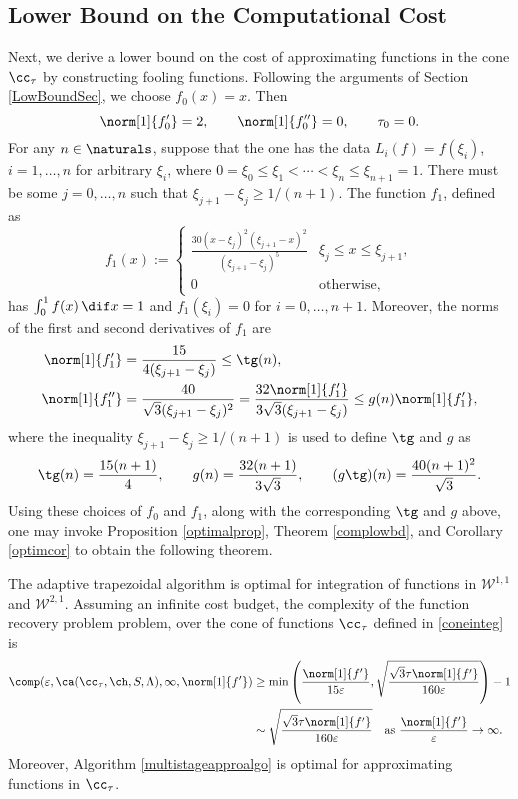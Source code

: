 \subsection{Lower Bound on the Computational Cost}
Next, we derive a lower bound on the cost of approximating functions in the cone $\cc_{\tau}$ by constructing fooling functions. Following the arguments of Section \ref{LowBoundSec}, we choose  $f_0(x)=x.$ Then
\[
\norm[1]{f'_0}=2, \qquad \norm[1]{f''_0}=0, \qquad \tau_0=0.
\]
For any $n \in \naturals$, suppose that the one has the data $L_i(f)=f(\xi_i)$, $i=1, \ldots, n$ for arbitrary $\xi_i$, where $0=\xi_0 \le \xi_1 < \cdots < \xi_n \le \xi_{n+1} = 1$.  There must be some $j=0, \ldots, n$ such that $\xi_{j+1} - \xi_j \ge 1/(n+1)$.  The function $f_{1}$, defined as
$$
f_{1}(x):=\begin{cases} \displaystyle
\frac{30(x-\xi_{j})^{2}(\xi_{j+1}-x)^{2}}{(\xi_{j+1}-\xi_{j})^5} & \xi_{j} \le x \leq \xi_{j+1},\\
0 & \text{otherwise},
\end{cases}
$$
has $\int_0^1 f(x) \, \dif x=1$ and $f_1(\xi_i)=0$ for $i=0, \ldots, n+1$.  Moreover, the norms of the first and second derivatives of $f_1$ are
\begin{align*}
\norm[1]{f'_1}&=\frac{15}{4(\xi_{j+1}-\xi_{j})}\leq \tg(n),\\
\norm[1]{f''_1}&=\frac{40}{\sqrt{3}(\xi_{j+1}-\xi_{j})^2}
=\frac{32\norm[1]{f'_1}}{3\sqrt{3}(\xi_{j+1}-\xi_{j})}
 \leq g(n) \norm[1]{f'_1},
\end{align*}
where the inequality $\xi_{j+1} - \xi_j \ge 1/(n+1)$ is used to define $\tg$ and $g$ as
\[
\tg(n) = \frac{15(n+1)}{4}, \qquad g(n) = \frac{32(n+1)}{3\sqrt{3}}, \qquad (g\tg)(n) = \frac{40(n+1)^2}{\sqrt{3}}.
\]
Using these choices of $f_0$ and $f_1$, along with the corresponding $\tg$ and $g$ above, one may invoke Proposition \ref{optimalprop}, Theorem \ref{complowbd}, and Corollary \ref{optimcor} to obtain the following theorem.

\begin{theorem} \label{complowbdinteg} The adaptive trapezoidal algorithm is optimal for integration of functions in $\mathcal{W}^{1,1}$ and $\mathcal{W}^{2,1}$. Assuming an infinite cost budget, the complexity of the function recovery problem problem, over the cone of functions $\cc_{\tau}$ defined in \eqref{coneinteg} is
\begin{align*}
\comp(\varepsilon,\ca(\cc_{\tau},\ch,S,\Lambda),\infty,\norm[1]{f'})
&\ge \min\left(\frac{\norm[1]{f'}}{15 \varepsilon}, \sqrt{\frac{\sqrt{3}\tau\norm[1]{f'}}{160\varepsilon}} \right)-1\\
& \sim \sqrt{\frac{\sqrt{3}\tau\norm[1]{f'}}{160\varepsilon}}  \quad\text{as } \frac{\norm[1]{f'}}{\varepsilon} \to \infty.
\end{align*}
Moreover, Algorithm \ref{multistageapproalgo} is optimal for approximating functions in $\cc_{\tau}$.
\end{theorem}

